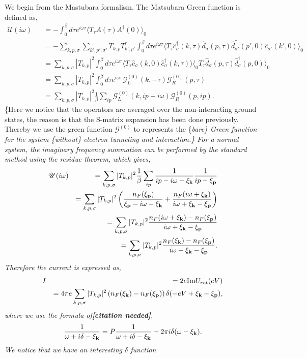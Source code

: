\documentclass[11pt]{article}
\begin{document}
We begin from the Mastubara formalism. The Matsubara Green function is
defined as, \begin{eqnarray}
\mathscr{U}(i\omega) && = - \int_0^\beta d\tau  e^{i\omega \tau}   \langle T_\tau A(\tau) A^\dagger(0) \rangle_0
 \\\nonumber
&& =- \sum_{k,p,\sigma} \sum_{k',p',\sigma'} T_{k,p} T^*_{k',p'}  \int_0^\beta d\tau  e^{i\omega \tau}  \langle T_\tau \hat c^\dagger_\sigma(k,\tau) \hat d_\sigma(p,\tau) \hat d^\dagger_{\sigma'}(p',0) \hat c_{\sigma'}(k',0) \rangle_0
\\\nonumber
&& = \sum_{k,p,\sigma}  |T_{k,p}|^2 \int_0^\beta d\tau  e^{i\omega \tau}  \langle T_\tau \hat c_{\sigma}(k,0)  \hat c^\dagger_\sigma(k,\tau) \rangle \langle_0 T_\tau  \hat d_\sigma(p,\tau) \hat d^\dagger_{\sigma}(p,0)  \rangle_0
\\\nonumber
&& =\sum_{k,p,\sigma}  |T_{k,p}|^2 \int_0^\beta d\tau  e^{i\omega \tau}   \mathscr{G}^{(0)}_L(k,-\tau)  \mathscr{G}^{(0)}_R(p,\tau)
\\\nonumber
&& =\sum_{k,p,\sigma}  |T_{k,p}|^2 \frac{1}{\beta } \sum_{ip}  \mathscr{G}^{(0)}_L(k,ip-i\omega)  \mathscr{G}^{(0)}_R(p,ip).
\end{eqnarray} \{\pb Here we notice that the operators are averaged over
the non-interacting ground states, the reason is that the S-matrix
expansion has been done previously. Thereby we use the green function
\(\mathscr{G}^{(0)}\) to represents the \{\it bare\} Green function for
the system \{\it without\} electron tunneling and interaction.\} For a
normal system, the imaginary frequency summation can be performed by the
standard method using the residue theorem, which gives, \begin{eqnarray}
\mathscr{U}(i\omega) &&= \sum_{k,p,\sigma}  |T_{k,p}|^2 \frac{1}{\beta } \sum_{ip} \frac{1}{ip-i\omega-\xi_{\bf k}} \frac{1}{ip-\xi_{\bf p}}
\\\nonumber
&&= \sum_{k,p,\sigma}  |T_{k,p}|^2  \left(\frac{n_F(\xi_{\bf p})}{\xi_{\bf p} -i\omega -\xi_{\bf k}} + \frac{n_F(i\omega+\xi_{\bf k})}{i\omega+\xi_{\bf k} -\xi_{\bf p}}\right)
\\\nonumber
&&=  \sum_{k,p,\sigma}  |T_{k,p}|^2  \frac{n_F(i\omega+\xi_{\bf k})- n_F(\xi_{\bf p})}{i\omega+\xi_{\bf k} -\xi_{\bf p}}
\\\nonumber
&&=  \sum_{k,p,\sigma}  |T_{k,p}|^2  \frac{n_F(\xi_{\bf k})- n_F(\xi_{\bf p})}{i\omega+\xi_{\bf k} -\xi_{\bf p}}.
\end{eqnarray} Therefore the current is expressed as, \begin{eqnarray}
I  &&= 2e {\rm Im} U_{ret} (eV) 
\\\nonumber
&& = 4 \pi e  \sum_{k,p,\sigma}  |T_{k,p}|^2  \left( n_F(\xi_{\bf k})- n_F(\xi_{\bf p}) \right)  \delta(-eV   +\xi_{\bf k} -\xi_{\bf p}),
\end{eqnarray} where we use the formula of\textbf{{[}citation
needed{]}}, \begin{eqnarray}
\frac{1}{\omega + i \delta - \xi_{\bf k}} = P\frac{1}{\omega + i \delta - \xi_{\bf k}} + 2\pi i   \delta (\omega - \xi_{\bf k}).
\end{eqnarray} We notice that we have an interesting \(\delta\) function
\end{document}
